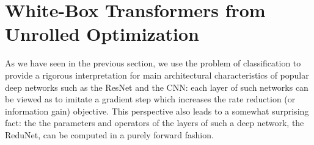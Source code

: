 \documentclass[../../book-main.tex]{subfiles}
\begin{document}
 




\section{White-Box Transformers from Unrolled Optimization}\label{sec:chap4-white-box-transformer}
As we have seen in the previous section, we use the problem of classification to provide a rigorous interpretation for main architectural characteristics of popular deep networks such as the ResNet and the CNN: each layer of such networks can be viewed as to imitate a gradient step which increases the rate reduction (or information gain) objective. This perspective also leads to a somewhat surprising fact: the the parameters and operators  of the layers of such a deep network, the ReduNet, can be  computed in a purely forward fashion.
\end{document}

